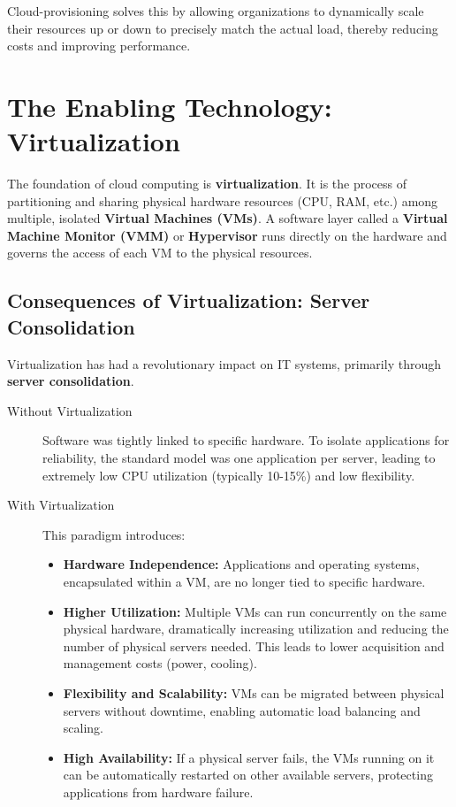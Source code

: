 Cloud-provisioning solves this by allowing organizations to dynamically scale their resources up or down to precisely match the actual load, thereby reducing costs and improving performance.


\section{The Enabling Technology: Virtualization}
The foundation of cloud computing is \textbf{virtualization}. It is the process of partitioning and sharing physical hardware resources (CPU, RAM, etc.) among multiple, isolated \textbf{Virtual Machines (VMs)}. A software layer called a \textbf{Virtual Machine Monitor (VMM)} or \textbf{Hypervisor} runs directly on the hardware and governs the access of each VM to the physical resources.

\subsection{Consequences of Virtualization: Server Consolidation}
Virtualization has had a revolutionary impact on IT systems, primarily through \textbf{server consolidation}.
\begin{description}
    \item[Without Virtualization] Software was tightly linked to specific hardware. To isolate applications for reliability, the standard model was one application per server, leading to extremely low CPU utilization (typically 10-15\%) and low flexibility.
    \item[With Virtualization] This paradigm introduces:
    \begin{itemize}
        \item \textbf{Hardware Independence:} Applications and operating systems, encapsulated within a VM, are no longer tied to specific hardware.
        \item \textbf{Higher Utilization:} Multiple VMs can run concurrently on the same physical hardware, dramatically increasing utilization and reducing the number of physical servers needed. This leads to lower acquisition and management costs (power, cooling).
        \item \textbf{Flexibility and Scalability:} VMs can be migrated between physical servers without downtime, enabling automatic load balancing and scaling.
        \item \textbf{High Availability:} If a physical server fails, the VMs running on it can be automatically restarted on other available servers, protecting applications from hardware failure.
    \end{itemize}
\end{description}

